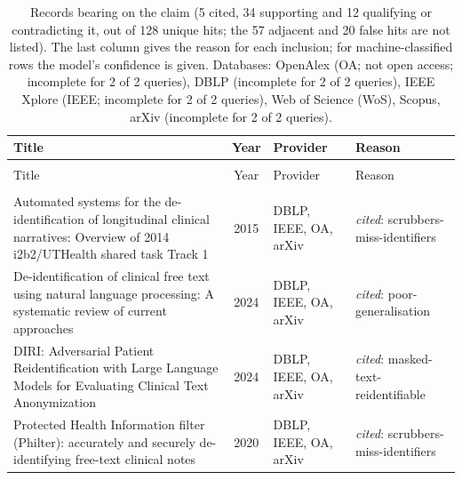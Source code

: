 
\begingroup\footnotesize
\begin{longtable}{@{}%
  >{\raggedright\arraybackslash}p{}c%
  >{\raggedright\arraybackslash}p{}%
  >{\raggedright\arraybackslash}p{}@{}}
\caption{Records bearing on the claim (5 cited, 34 supporting and 12 qualifying or contradicting it, out of 128 unique hits; the 57 adjacent and 20 false hits are not listed). The last column gives the reason for each inclusion; for machine-classified rows the model's confidence is given. Databases: OpenAlex (OA; not open access; incomplete for 2 of 2 queries), DBLP (incomplete for 2 of 2 queries), IEEE Xplore (IEEE; incomplete for 2 of 2 queries), Web of Science (WoS), Scopus, arXiv (incomplete for 2 of 2 queries).}\label{tab:t-free-text-deid}\\
\toprule
Title & Year & Provider & Reason \\
\midrule
\endfirsthead
\multicolumn{4}{@{}l}{\emph{\tablename~\thetable{} (cont.)}}\\
\toprule
Title & Year & Provider & Reason \\
\midrule
\endhead
\midrule \multicolumn{4}{r@{}}{\emph{continued on next page}}\\
\endfoot
\bottomrule
\endlastfoot
Automated systems for the de-identification of longitudinal clinical narratives: Overview of 2014 i2b2/UTHealth shared task Track 1 & 2015 & DBLP, IEEE, OA, arXiv & \emph{cited}: scrubbers-miss-identifiers \\
De-identification of clinical free text using natural language processing: A systematic review of current approaches & 2024 & DBLP, IEEE, OA, arXiv & \emph{cited}: poor-generalisation \\
DIRI: Adversarial Patient Reidentification with Large Language Models for Evaluating Clinical Text Anonymization & 2024 & DBLP, IEEE, OA, arXiv & \emph{cited}: masked-text-reidentifiable \\
Protected Health Information filter (Philter): accurately and securely de-identifying free-text clinical notes & 2020 & DBLP, IEEE, OA, arXiv & \emph{cited}: scrubbers-miss-identifiers \\

\end{longtable}
